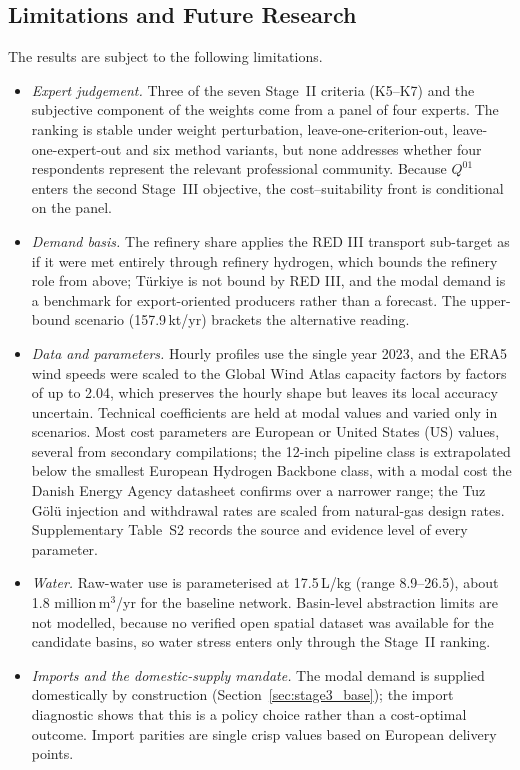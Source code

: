 \documentclass[preprint,12pt,authoryear]{elsarticle}
\begin{document}
\subsection{Limitations and Future Research}
\label{sec:limits}
The results are subject to the following limitations.
\begin{itemize}
    \item \textit{Expert judgement.} Three of the seven Stage~II criteria (K5--K7) and the subjective component of the weights come from a panel of four experts. The ranking is stable under weight perturbation, leave-one-criterion-out, leave-one-expert-out and six method variants, but none addresses whether four respondents represent the relevant professional community. Because $Q^{01}$ enters the second Stage~III objective, the cost--suitability front is conditional on the panel.
    \item \textit{Demand basis.} The refinery share applies the RED III transport sub-target as if it were met entirely through refinery hydrogen, which bounds the refinery role from above; Türkiye is not bound by RED III, and the modal demand is a benchmark for export-oriented producers rather than a forecast. The upper-bound scenario (157.9\,kt/yr) brackets the alternative reading.
    \item \textit{Data and parameters.} Hourly profiles use the single year 2023, and the ERA5 wind speeds were scaled to the Global Wind Atlas capacity factors by factors of up to 2.04, which preserves the hourly shape but leaves its local accuracy uncertain. Technical coefficients are held at modal values and varied only in scenarios. Most cost parameters are European or United States (US) values, several from secondary compilations; the 12-inch pipeline class is extrapolated below the smallest European Hydrogen Backbone class, with a modal cost the Danish Energy Agency datasheet confirms over a narrower range; the Tuz Gölü injection and withdrawal rates are scaled from natural-gas design rates. Supplementary Table~S2 records the source and evidence level of every parameter.
    \item \textit{Water.} Raw-water use is parameterised at 17.5\,L/kg (range 8.9--26.5), about 1.8 million\,m$^3$/yr for the baseline network. Basin-level abstraction limits are not modelled, because no verified open spatial dataset was available for the candidate basins, so water stress enters only through the Stage~II ranking.
    \item \textit{Imports and the domestic-supply mandate.} The modal demand is supplied domestically by construction (Section~\ref{sec:stage3_base}); the import diagnostic shows that this is a policy choice rather than a cost-optimal outcome. Import parities are single crisp values based on European delivery points.

\end{itemize}
\end{document}
